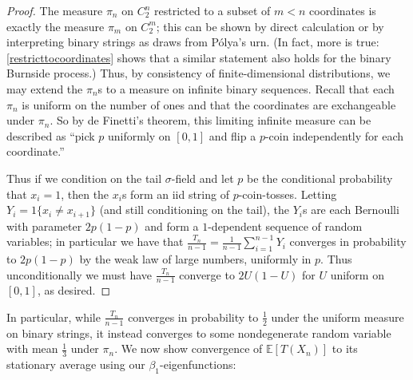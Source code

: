 \documentclass[11pt]{article}
\newcounter{r}
\newcounter{s}
\numberwithin{equation}{section}
\begin{document}
\begin{proof}
The measure $\pi_n$ on $C_2^n$ restricted to a subset of $m < n$ coordinates is exactly the measure $\pi_m$ on $C_2^m$; this can be shown by direct calculation or by interpreting binary strings as draws from P\'olya's urn. (In fact, more is true: \cref{restricttocoordinates} shows that a similar statement also holds for the binary Burnside process.) Thus, by consistency of finite-dimensional distributions, we may extend the $\pi_n$s to a measure on infinite binary sequences. Recall that each $\pi_n$ is uniform on the number of ones and that the coordinates are exchangeable under $\pi_n$. So by de Finetti's theorem, this limiting infinite measure can be described as ``pick $p$ uniformly on $[0, 1]$ and flip a $p$-coin independently for each coordinate.''

Thus if we condition on the tail $\sigma$-field and let $p$ be the conditional probability that $x_i = 1$, then the $x_i$s form an iid string of $p$-coin-tosses. Letting $Y_i = 1\{x_i \ne x_{i+1}\}$ (and still conditioning on the tail), the $Y_i$s are each Bernoulli with parameter $2p(1-p)$ and form a $1$-dependent sequence of random variables; in particular we have that $\frac{T_n}{n-1} = \frac{1}{n-1} \sum_{i=1}^{n-1} Y_i$ converges in probability to $2p(1-p)$ by the weak law of large numbers, uniformly in $p$. Thus unconditionally we must have $\frac{T_n}{n-1}$ converge to $2U(1-U)$ for $U$ uniform on $[0, 1]$, as desired.
\end{proof}

In particular, while $\frac{T_n}{n-1}$ converges in probability to $\frac{1}{2}$ under the uniform measure on binary strings, it instead converges to some nondegenerate random variable with mean $\frac{1}{3}$ under $\pi_n$. We now show convergence of $\mathbb{E}[T(X_n)]$ to its stationary average using our $\beta_1$-eigenfunctions:
\end{document}
